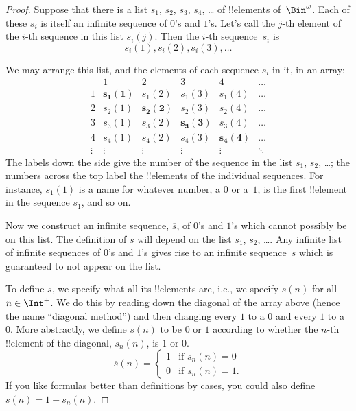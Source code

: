 \documentclass[../../../include/open-logic-section]{subfiles}
\begin{document}
\begin{proof}
Suppose that there is a list $s_{1}$, $s_{2}$, $s_{3}$, $s_{4}$,
\dots{} of !!{element}s of~$\Bin^\omega$.  Each of these $s_i$ is
itself an infinite sequence of $0$'s and $1$'s.  Let's call the $j$-th
element of the $i$-th sequence in this list $s_i(j)$. Then the $i$-th
sequence~$s_i$ is
\[
s_i(1), s_i(2), s_i(3), \dots
\]

We may arrange this list, and the elements of each sequence $s_i$ in
it, in an array:
\[
\begin{array}{c|c|c|c|c|c}
& 1 & 2 & 3 & 4 & \dots \\\hline
1 & \mathbf{s_{1}(1)} & s_{1}(2) & s_{1}(3) & s_1(4) & \dots \\\hline
2 & s_{2}(1)& \mathbf{s_{2}(2)} & s_2(3) & s_2(4) & \dots \\\hline
3 & s_{3}(1)& s_{3}(2) & \mathbf{s_3(3)} & s_3(4) & \dots \\\hline
4 & s_{4}(1)& s_{4}(2) & s_4(3) & \mathbf{s_4(4)} & \dots \\\hline
\vdots & \vdots & \vdots & \vdots & \vdots & \mathbf{\ddots}
\end{array}
\]
The labels down the side give the number of the sequence in the list
$s_1$, $s_2$, \dots; the numbers across the top label the !!{element}s
of the individual sequences. For instance, $s_{1}(1)$ is a name for
whatever number, a $0$ or a~$1$, is the first !!{element} in the
sequence $s_{1}$, and so on.

Now we construct an infinite sequence, $\overline{s}$, of $0$'s and
$1$'s which cannot possibly be on this list.  The definition of
$\overline{s}$ will depend on the list $s_1$, $s_2$, \dots.  Any
infinite list of infinite sequences of $0$'s and $1$'s gives rise to
an infinite sequence~$\overline{s}$ which is guaranteed to not appear
on the list.

To define $\overline{s}$, we specify what all its !!{element}s are,
i.e., we specify $\overline{s}(n)$ for all $n \in \Int^+$.  We do this
by reading down the diagonal of the array above (hence the name
``diagonal method'') and then changing every $1$ to a $0$ and every
$1$ to a~$0$. More abstractly, we define $\overline{s}(n)$ to be $0$
or $1$ according to whether the $n$-th !!{element} of the diagonal,
$s_n(n)$, is $1$ or $0$.
\[
\overline{s}(n) =
\begin{cases}
1 & \text{if $s_{n}(n) = 0$}\\
0 & \text{if $s_{n}(n) = 1$}.
\end{cases}
\]
If you like formulas better than definitions by cases, you could also
define $\overline{s}(n) = 1 - s_n(n)$.


\end{proof}
\end{document}
